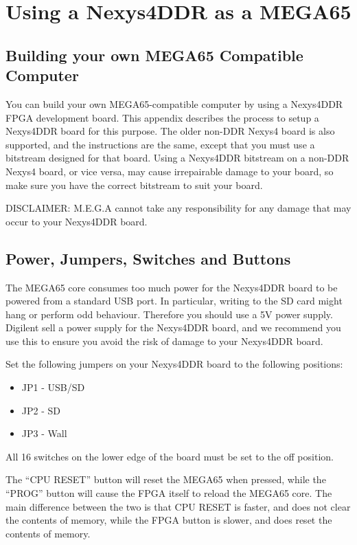 \chapter{Using a Nexys4DDR as a MEGA65}

\section{Building your own MEGA65 Compatible Computer}

You can build your own MEGA65-compatible computer by using a Nexys4DDR FPGA development board.
This appendix describes the process to setup a Nexys4DDR board for this purpose.
The older non-DDR Nexys4 board is also supported, and the instructions are the same, except that
you must use a bitstream designed for that board.
Using a Nexys4DDR bitstream on a non-DDR Nexys4 board, or vice versa, may cause irrepairable damage to your board, so make sure
you have the correct bitstream to suit your board.


DISCLAIMER: M.E.G.A cannot take any responsibility for any damage that may occur to your Nexys4DDR board.

\newpage

\section{Power, Jumpers, Switches and Buttons}

The MEGA65 core consumes too much power for the Nexys4DDR board to be powered from a standard USB port.
In particular, writing to the SD card might hang or perform odd behaviour.
Therefore you should use a 5V power supply.
Digilent sell a power supply for the Nexys4DDR board, and we recommend you use this to ensure you avoid the risk of damage
to your Nexys4DDR board.

Set the following jumpers on your Nexys4DDR board to the following positions:

\begin{itemize}
\item{JP1} - USB/SD
\item{JP2} - SD
\item {JP3} - Wall
\end{itemize}


All 16 switches on the lower edge of the board must be set to the off position.

The ``CPU RESET'' button will reset the MEGA65 when pressed, while the ``PROG'' button will cause the FPGA itself to reload the MEGA65
core.  The main difference between the two is that CPU RESET is faster, and does not clear the contents of memory, while the FPGA button
is slower, and does reset the contents of memory.

